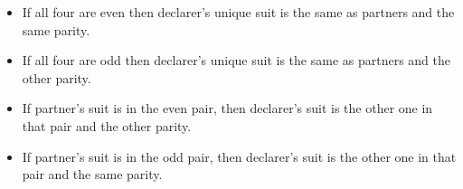\documentclass[a4paper,12pt]{article}
\begin{document}
\begin{itemize}
\item If all four are even then declarer's unique suit is the same as partners and the same parity.
\item If all four are odd then declarer's unique suit is the same as partners and the other parity.
\item If partner's suit is in the even pair, then declarer's suit is the other one in that pair and the other parity.
\item If partner's suit is in the odd pair, then declarer's suit is the other one in that pair and the same parity.
\end{itemize}
\end{document}
